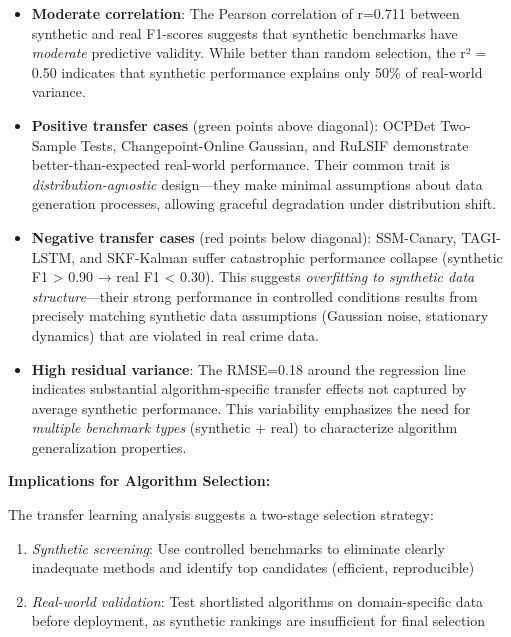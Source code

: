 \begin{itemize}
    \item \textbf{Moderate correlation}: The Pearson correlation of r=0.711 between synthetic and real F1-scores suggests that synthetic benchmarks have \textit{moderate} predictive validity. While better than random selection, the r² = 0.50 indicates that synthetic performance explains only 50\% of real-world variance.
    
    \item \textbf{Positive transfer cases} (green points above diagonal): OCPDet Two-Sample Tests, Changepoint-Online Gaussian, and RuLSIF demonstrate better-than-expected real-world performance. Their common trait is \textit{distribution-agnostic} design—they make minimal assumptions about data generation processes, allowing graceful degradation under distribution shift.
    
    \item \textbf{Negative transfer cases} (red points below diagonal): SSM-Canary, TAGI-LSTM, and SKF-Kalman suffer catastrophic performance collapse (synthetic F1 > 0.90 → real F1 < 0.30). This suggests \textit{overfitting to synthetic data structure}—their strong performance in controlled conditions results from precisely matching synthetic data assumptions (Gaussian noise, stationary dynamics) that are violated in real crime data.
    
    \item \textbf{High residual variance}: The RMSE=0.18 around the regression line indicates substantial algorithm-specific transfer effects not captured by average synthetic performance. This variability emphasizes the need for \textit{multiple benchmark types} (synthetic + real) to characterize algorithm generalization properties.
\end{itemize}

\textbf{Implications for Algorithm Selection:}

The transfer learning analysis suggests a two-stage selection strategy:
\begin{enumerate}
    \item \textit{Synthetic screening}: Use controlled benchmarks to eliminate clearly inadequate methods and identify top candidates (efficient, reproducible)
    \item \textit{Real-world validation}: Test shortlisted algorithms on domain-specific data before deployment, as synthetic rankings are insufficient for final selection
\end{enumerate}

